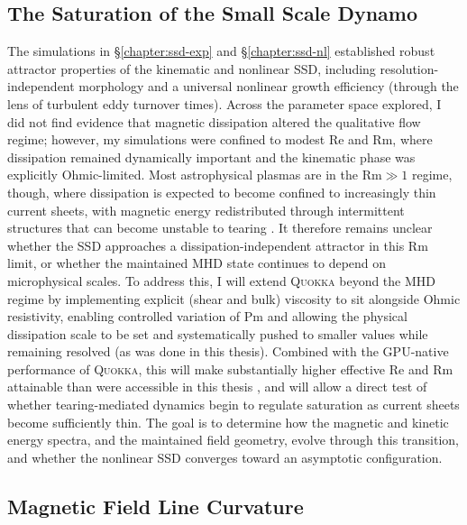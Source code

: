\subsection{The Saturation of the Small Scale Dynamo}

The simulations in \S\ref{chapter:ssd-exp} and \S\ref{chapter:ssd-nl} established robust attractor properties of the kinematic and nonlinear SSD, including resolution-independent morphology and a universal nonlinear growth efficiency (through the lens of turbulent eddy turnover times). Across the parameter space explored, I did not find evidence that magnetic dissipation altered the qualitative flow regime; however, my simulations were confined to modest $\mathrm{Re}$ and $\mathrm{Rm}$, where dissipation remained dynamically important and the kinematic phase was explicitly Ohmic-limited. Most astrophysical plasmas are in the $\mathrm{Rm} \gg 1$ regime, though, where dissipation is expected to become confined to increasingly thin current sheets, with magnetic energy redistributed through intermittent structures that can become unstable to tearing \citep{loureiro2017role, galishnikova2022tearing, beattie2025spectrum}. It therefore remains unclear whether the SSD approaches a dissipation-independent attractor in this $\mathrm{Rm}$ limit, or whether the maintained MHD state continues to depend on microphysical scales. To address this, I will extend \textsc{Quokka} beyond the MHD regime by implementing explicit (shear and bulk) viscosity to sit alongside Ohmic resistivity, enabling controlled variation of $\mathrm{Pm}$ and allowing the physical dissipation scale to be set and systematically pushed to smaller values while remaining resolved (as was done in this thesis). Combined with the GPU-native performance of \textsc{Quokka}, this will make substantially higher effective $\mathrm{Re}$ and $\mathrm{Rm}$ attainable than were accessible in this thesis \citep{ji2022magnetic}, and will allow a direct test of whether tearing-mediated dynamics begin to regulate saturation as current sheets become sufficiently thin. The goal is to determine how the magnetic and kinetic energy spectra, and the maintained field geometry, evolve through this transition, and whether the nonlinear SSD converges toward an asymptotic configuration.

\subsection{Magnetic Field Line Curvature}

